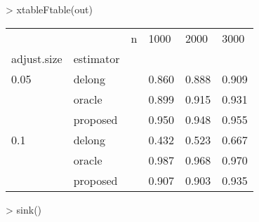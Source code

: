 > xtableFtable(out)
\begin{table}[ht]
\centering
\begin{tabular}{lll |rrr}
  \hline
             &           & n & \multicolumn{1}{l}{  1000} & \multicolumn{1}{l}{  2000} & \multicolumn{1}{l}{  3000} \\ 
  adjust.size & estimator &   & \multicolumn{1}{l}{      } & \multicolumn{1}{l}{      } & \multicolumn{1}{l}{      } \\ 
   \hline
0.05        & delong    &   & 0.860 & 0.888 & 0.909 \\ 
              & oracle    &   & 0.899 & 0.915 & 0.931 \\ 
              & proposed  &   & 0.950 & 0.948 & 0.955 \\ 
  0.1         & delong    &   & 0.432 & 0.523 & 0.667 \\ 
              & oracle    &   & 0.987 & 0.968 & 0.970 \\ 
              & proposed  &   & 0.907 & 0.903 & 0.935 \\ 
   \hline
\end{tabular}
\end{table}
> sink()
